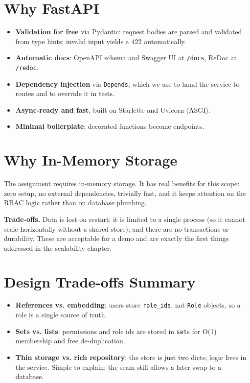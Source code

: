 \documentclass[11pt,a4paper]{report}
\begin{document}
\section{Why FastAPI}

\begin{itemize}[leftmargin=1.4em]
  \item \textbf{Validation for free} via Pydantic: request bodies are parsed and
        validated from type hints; invalid input yields a 422 automatically.
  \item \textbf{Automatic docs}: OpenAPI schema and Swagger UI at
        \texttt{/docs}, ReDoc at \texttt{/redoc}.
  \item \textbf{Dependency injection} via \texttt{Depends}, which we use to hand
        the service to routes and to override it in tests.
  \item \textbf{Async-ready and fast}, built on Starlette and Uvicorn (ASGI).
  \item \textbf{Minimal boilerplate}: decorated functions become endpoints.
\end{itemize}

\section{Why In-Memory Storage}

The assignment requires in-memory storage. It has real benefits for this scope:
zero setup, no external dependencies, trivially fast, and it keeps attention on
the RBAC logic rather than on database plumbing.

\textbf{Trade-offs.} Data is lost on restart; it is limited to a single process
(so it cannot scale horizontally without a shared store); and there are no
transactions or durability. These are acceptable for a demo and are exactly the
first things addressed in the scalability chapter.

\section{Design Trade-offs Summary}

\begin{itemize}[leftmargin=1.4em]
  \item \textbf{References vs. embedding}: users store \texttt{role\_ids}, not
        \texttt{Role} objects, so a role is a single source of truth.
  \item \textbf{Sets vs. lists}: permissions and role ids are stored in
        \texttt{set}s for O(1) membership and free de-duplication.
  \item \textbf{Thin storage vs. rich repository}: the store is just two dicts;
        logic lives in the service. Simple to explain; the seam still allows a
        later swap to a database.
\end{itemize}
\end{document}

